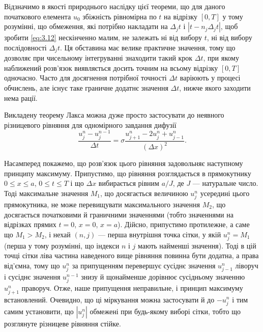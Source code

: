 Відзначимо в якості природнього наслідку цієї теореми, що для даного початкового елемента $u_0$ збіжність рівномірна по $t$ на відрізку $[0, T]$ у тому розумінні, що обмеження, які потрібно накладати на $\Delta_j t$ і $|t - n_j \Delta_j t|$, щоб зробити \eqref{eq:3.12} нескінченно малим, не залежать ні від вибору $t$, ні від вибору послідовності $\Delta_j t$. Ця обставина має велике практичне значення, тому що дозволяє при чисельному інтегруванні знаходити такий крок $\Delta t$, при якому наближений розв'язок виявляється досить точним на всьому відрізку $[0, T]$ одночасно. Часто для досягнення потрібної точності $\Delta t$ варіюють у процесі обчислень, але існує таке граничне додатнє значення $\Delta t$, нижче якого заходити нема рації. \medskip

Викладену теорему Лакса можна дуже просто застосувати до неявного різницевого рівняння для одномірного завдання дифузії
\begin{equation}
    \frac{u_j^n - u_j^{n - 1}}{\Delta t} = \sigma \frac{u_{j + 1}^n - 2 u_j^n + u_{j - 1}^n}{(\Delta x)^2}.
\end{equation}
 
Насамперед  покажемо, що розв'язок цього рівняння задовольняє наступному принципу максимуму. Припустимо, що рівняння розглядається в прямокутнику $0 \le x \le a$, $0 \le t \le T$ і що $\Delta x$ вибирається рівним $a / J$, де $J$ --- натуральне число. Тоді максимальне значення $M_1$, що досягається величиною $u_j^n$ усередині цього прямокутника, не може перевищувати максимального значення $M_2$, що досягається початковими й граничними значеннями (тобто значеннями на відрізках прямих $t = 0$, $x = 0$, $x = a$). Дійсно, припустимо протилежне, а саме що $M_1 > M_2$, і нехай $(n,j)$ --- перша внутрішня точка сітки, у якій $u_j^n = M_1$ (перша у тому розумінні, що індекси $n$ і $j$ мають найменші значення). Тоді в цій точці сітки ліва частина наведеного вище рівняння повинна бути додатна, а права від'ємна, тому що $u_j^n$ за припущенням перевершує сусіднє значення $u_{j - 1}^n$ ліворуч і сусіднє значення $u_j^{n - 1}$ знизу й щонайменше дорівнює сусідньому значенню $u_{j + 1}^n$  праворуч. Отже, наше припущення неправильне, і принцип максимуму встановлений. Очевидно, що ці міркування можна застосувати й до $-u_j^n$ і тим самим установити, що $|u_j^n|$ обмежені при будь-якому виборі сітки, тобто що розглянуте різницеве рівняння стійке. \medskip


